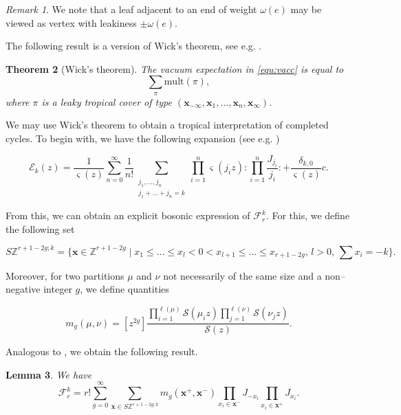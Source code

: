 \documentclass[10pt,a4paper,oneside,no-math,reqno]{amsart}%
\theoremstyle{plain}
\newtheorem{theorem}{Theorem}[section]
\newtheorem{lemma}[theorem]{Lemma}
\theoremstyle{definition}
\theoremstyle{remark}
\newtheorem{remark}[theorem]{Remark}
\numberwithin{equation}{section}
\newcommand{\1}{\mathds{1}}
\newcommand{\<}{\langle}
\renewcommand{\>}{\rangle}
\begin{document}
\begin{remark}
    We note that a leaf adjacent to an end of weight $\omega(e)$ may be viewed as vertex with leakiness $\pm \omega(e)$.
\end{remark}

The following result is a version of Wick's theorem, see e.g. \cite{Wic50,BG16}.

\begin{theorem}[{Wick's theorem}]
    The vacuum expectation in \cref{equ:vacc} is equal to
    \begin{equation}
        \sum_\pi\mathrm{mult}(\pi),
    \end{equation}
    where $\pi$ is a leaky tropical cover of type $(\mathbf{x}_{-\infty},\mathbf{x}_1,\dots,\mathbf{x}_n,\mathbf{x}_\infty)$.
\end{theorem}


We may use Wick's theorem to obtain a tropical interpretation of completed cycles. To begin with, we have the following expansion (see e.g. \cite{AKL25})

\begin{equation}
    \mathcal{E}_{k}(z)
    =
    \frac{1}{\varsigma(z)} \sum_{n=0}^\infty\frac{1}{n!} \sum_{\substack{j_1,\dots,j_n\\j_1+\dots+j_n=k}} \prod_{i=1}^n \varsigma (j_iz)\colon\prod_{i=1}^n\frac{J_{j_i}}{j_i}\colon+\frac{\delta_{k,0}}{\varsigma(z)} c.
\end{equation}

From this, we can obtain an explicit bosonic expression of $\mathcal{F}_r^k$. For this, we define the following set

\begin{equation}
    S\mathbb{Z}^{r+1-2g;k}
    =
    \{ \textbf{x}\in\mathbb{Z}^{r+1-2g}\mid x_1\le \dots\le x_l<0<x_{l+1}\le\dots\le x_{r+1-2g},\, l>0,\,\sum x_i=-k \}.
\end{equation}

Moreover, for two partitions $\mu$ and $\nu$ not necessarily of the same size and a non--negative integer $g$, we define quantities

\begin{equation}
    m_g(\mu,\nu)
    =
    [z^{2g}] \frac{\prod_{i=1}^{\ell(\mu)} \mathcal{S}(\mu_iz) \prod_{j=1}^{\ell(\nu)} \mathcal{S}(\nu_jz)}{\mathcal{S}(z)}.
\end{equation}

Analogous to \cite[Lemma 3.3]{HL22}, we obtain the following result.

\begin{lemma}\label{prop-expansion}
    We have
    \begin{equation}
        \mathcal{F}_r^k
        =
        r!\sum_{g=0}^\infty \sum_{\textbf{x}\in S\mathbb{Z}^{r+1-2g;k}} m_g(\textbf{x}^+,\textbf{x}^-) \prod_{x_i\in\textbf{x}^-} J_{-x_i} \prod_{x_i\in\textbf{x}^+} J_{x_i}.
    \end{equation}
\end{lemma}
\end{document}
